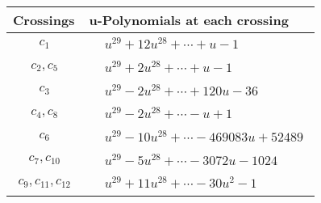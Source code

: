 \documentclass[1p]{elsarticle_modified}
\theoremstyle{definition}
\begin{document}
\begin{tabular}{m{50pt}|m{274pt}}
Crossings & \hspace{64pt}u-Polynomials at each crossing \\
\hline $$\begin{aligned}c_{1}\end{aligned}$$&$\begin{aligned}
&u^{29}+12 u^{28}+\cdots+u-1
\end{aligned}$\\
\hline $$\begin{aligned}c_{2},c_{5}\end{aligned}$$&$\begin{aligned}
&u^{29}+2 u^{28}+\cdots+u-1
\end{aligned}$\\
\hline $$\begin{aligned}c_{3}\end{aligned}$$&$\begin{aligned}
&u^{29}-2 u^{28}+\cdots+120 u-36
\end{aligned}$\\
\hline $$\begin{aligned}c_{4},c_{8}\end{aligned}$$&$\begin{aligned}
&u^{29}-2 u^{28}+\cdots- u+1
\end{aligned}$\\
\hline $$\begin{aligned}c_{6}\end{aligned}$$&$\begin{aligned}
&u^{29}-10 u^{28}+\cdots-469083 u+52489
\end{aligned}$\\
\hline $$\begin{aligned}c_{7},c_{10}\end{aligned}$$&$\begin{aligned}
&u^{29}-5 u^{28}+\cdots-3072 u-1024
\end{aligned}$\\
\hline $$\begin{aligned}c_{9},c_{11},c_{12}\end{aligned}$$&$\begin{aligned}
&u^{29}+11 u^{28}+\cdots-30 u^2-1
\end{aligned}$\\
\hline
\end{tabular}\\~\\
\newpage\renewcommand{\arraystretch}{1}
\end{document}
